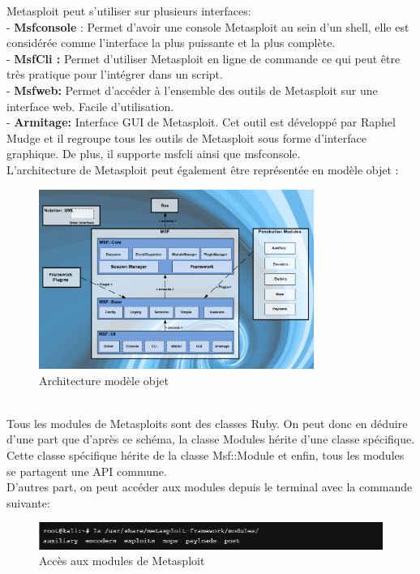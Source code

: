 \noindent Metasploit peut s’utiliser sur plusieurs interfaces:\\
- \textbf{Msfconsole} : Permet d’avoir une console Metasploit au sein d’un shell, elle est considérée comme l’interface la plus puissante et la plus complète.\\
- \textbf{MsfCli :} Permet d’utiliser Metasploit en ligne de commande ce qui peut être très pratique pour l’intégrer dans un script.\\
- \textbf{Msfweb:} Permet d’accéder à l’ensemble des outils de Metasploit sur une interface web. Facile d’utilisation.\\
- \textbf{Armitage:} Interface GUI de Metasploit. Cet outil est développé par Raphel Mudge et il regroupe tous les outils de Metasploit sous forme d’interface graphique. De plus, il supporte msfcli ainsi que msfconsole.\\

\noindent L’architecture de Metasploit peut également être représentée en modèle objet : 
\begin{figure}[htp!]
  \centering
  \setlength\figureheight{7cm}
  \setlength\figurewidth{9cm}
  \includegraphics[width=0.8\textwidth]{oui/Ancien/imangeancien/msfarch2.png}
  \caption{Architecture modèle objet}
  \label{fig:courbe-tikz}
\end{figure}\\
Tous les modules de Metasploits sont des classes Ruby. On peut donc en déduire d'une part que d'après ce schéma, la classe Modules hérite d'une classe spécifique. Cette classe spécifique hérite de la classe Msf::Module et enfin, tous les modules se partagent une API commune.\\

D'autres part, on peut accéder aux modules depuis le terminal avec la commande suivante:
\begin{figure}[htp!]
  \centering
  \setlength\figureheight{7cm}
  \setlength\figurewidth{9cm}
  \includegraphics[width=1\textwidth]{oui/Ancien/imangeancien/modules.PNG}
  \caption{Accès aux modules de Metasploit}
  \label{fig:courbe-tikz}
\end{figure}

